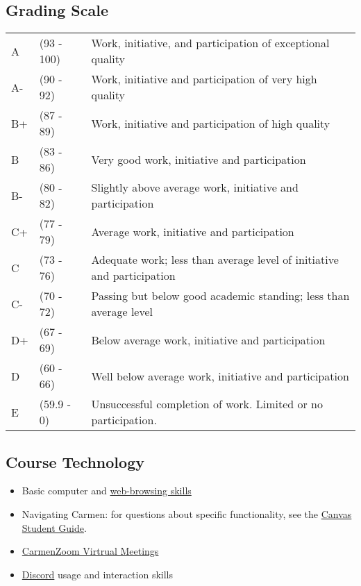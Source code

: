 \subsection{Grading Scale}

\begin{tabularx}{\textwidth}{@{}l @{}l X@{}}
      A \hspace*{1em} & (93 - 100) & Work, initiative, and participation of exceptional quality             \\
      A-              & (90 - 92)  & Work, initiative and participation of very high quality                \\
      B+              & (87 - 89)  & Work, initiative and participation of high quality                     \\
      B               & (83 - 86)  & Very good work, initiative and participation                           \\
      B-              & (80 - 82)  & Slightly above average work, initiative and participation              \\
      C+              & (77 - 79)  & Average work, initiative and participation                             \\
      C               & (73 - 76)  & Adequate work; less than average level of initiative and participation \\
      C-              & (70 - 72)  & Passing but below good academic standing; less than average level      \\
      D+              & (67 - 69)  & Below average work, initiative and participation                       \\
      D               & (60 - 66)  & Well below average work, initiative and participation                  \\
      E               & (59.9 - 0) & Unsuccessful completion of work. Limited or no participation.
\end{tabularx}


\subsection{Course Technology}

\begin{itemize}
      \tightlist
      \item Basic computer and \href{https://lmgtfy.com/}{web-browsing skills}
      \item Navigating Carmen: for questions about specific functionality, see the \href{https://community.canvaslms.com/docs/DOC-10701}{Canvas Student Guide}.
      \item \href{https://go.osu.edu/Bqdx}{CarmenZoom Virtrual Meetings}
      \item \href{http://discordapp.com/}{Discord} usage and interaction skills
\end{itemize}

